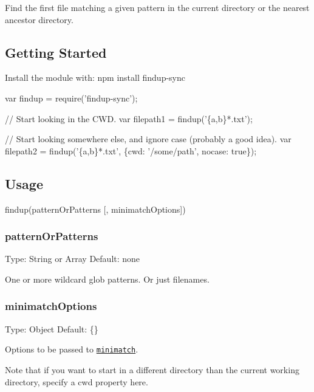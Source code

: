 Find the first file matching a given pattern in the current directory or the nearest ancestor directory.

\subsection*{Getting Started}

Install the module with\+: {\ttfamily npm install findup-\/sync}


\begin{DoxyCode}
var findup = require(\textcolor{stringliteral}{'findup-sync'});

\textcolor{comment}{// Start looking in the CWD.}
var filepath1 = findup(\textcolor{stringliteral}{'\{a,b\}*.txt'});

\textcolor{comment}{// Start looking somewhere else, and ignore case (probably a good idea).}
var filepath2 = findup(\textcolor{stringliteral}{'\{a,b\}*.txt'}, \{cwd: \textcolor{stringliteral}{'/some/path'}, nocase: \textcolor{keyword}{true}\});
\end{DoxyCode}


\subsection*{Usage}


\begin{DoxyCode}
findup(patternOrPatterns [, minimatchOptions])
\end{DoxyCode}


\subsubsection*{pattern\+Or\+Patterns}

Type\+: {\ttfamily String} or {\ttfamily Array} Default\+: none

One or more wildcard glob patterns. Or just filenames.

\subsubsection*{minimatch\+Options}

Type\+: {\ttfamily Object} Default\+: {\ttfamily \{\}}

Options to be passed to \href{https://github.com/isaacs/minimatch}{\tt minimatch}.

Note that if you want to start in a different directory than the current working directory, specify a {\ttfamily cwd} property here.

